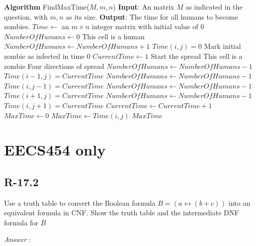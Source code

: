 \documentclass[11pt]{article}
\begin{document}
\begin{algorithmic}
	\State \textbf{Algorithm} FindMaxTime($M,m,n$)
	\State \textbf{Input}: An matrix $M$ as indicated in the question, with $m,n$ as its size.
	\State \textbf{Output}: The time for all humans to become zombies.
	\State $Time\gets$ an $m\times n$ integer matrix with initial value of $0$
	\State $NumberOfHumans\gets0$
			\Comment This cell is a human
				\State $NumberOfHumans \gets NumberOfHumans + 1$
			\EndIf
				\State $Time(i,j)=0$ \Comment Mark initial zombie as infected in time 0
			\EndIf
		\EndFor
	\EndFor
	\State
	\State $CurrentTime \gets 1$
	\Comment Start the spread
				\Comment This cell is a zombie
					 \Comment Four directions of spread
						\State $NumberOfHumans\gets NumberOfHumans -1$
						\State $Time(i-1,j)=CurrentTime$ 
					\EndIf
						\State $NumberOfHumans\gets NumberOfHumans -1$
						\State $Time(i,j-1)=CurrentTime$ 
					\EndIf
						\State $NumberOfHumans\gets NumberOfHumans -1$
						\State $Time(i+1,j)=CurrentTime$ 
					\EndIf
						\State $NumberOfHumans\gets NumberOfHumans -1$
						\State $Time(i,j+1)=CurrentTime$ 
					\EndIf
				\EndIf
			\EndFor
		\EndFor
		\State $CurrentTime\gets CurrentTime +1$
	\EndWhile
	\State
	\State $MaxTime \gets 0$
					\State $MaxTime \gets Time(i,j)$
				\EndIf
			\EndIf
		\EndFor
	\EndFor
	\State \Return $MaxTime$
\end{algorithmic}
\section{EECS454 only}
\subsection{R-17.2}
Use a truth table to convert the Boolean formula $B=(a\leftrightarrow(b+c))$ into an equivalent formula in CNF. Show the truth table and the intermediate DNF formula for $\overline{B}$

\noindent\emph{Answer} : 
\end{document}
